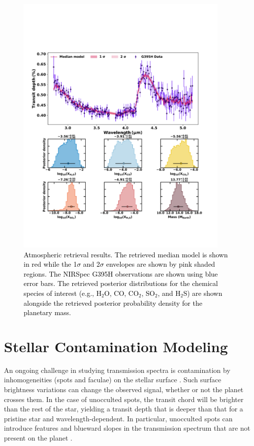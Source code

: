 \documentclass[twocolumn]{aastex63} %
\newcommand{\newedit}[1]{\textcolor{black}{#1}}
\begin{document}
\begin{figure}[]
    \centering
    \includegraphics[width=0.93\textwidth]{HIP67522_Retrieval_Results.pdf}
    \caption{\newedit{Atmospheric retrieval results. The retrieved median model is shown in red while the 1$\sigma$ and 2$\sigma$ envelopes are shown by pink shaded regions. The NIRSpec G395H observations are shown using blue error bars. The retrieved posterior distributions for the chemical species of interest (e.g., H$_2$O, CO, CO$_2$, SO$_2$, and H$_2$S) are shown alongside the retrieved posterior probability density for the planetary mass.}}
    \label{fig:retrieval}
\end{figure}

\section{Stellar Contamination Modeling}\label{sec:spots}

An ongoing challenge in studying transmission spectra is contamination by inhomogeneities (spots and faculae) on the stellar surface \citep[e.g.,][]{Rackham2018}. Such surface brightness variations can change the observed signal, whether or not the planet crosses them. In the case of unocculted spots, the transit chord will be brighter than the rest of the star, yielding a transit depth that is deeper than that for a pristine star and wavelength-dependent. In particular, unocculted spots can introduce features and blueward slopes in the transmission spectrum that are not present on the planet \citep[e.g.][]{Barclay2021,Thao2023}. 
\end{document}
